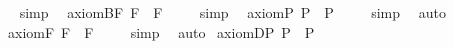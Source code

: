 \begin{isabellebody}
\isadelimproof
\ %
\endisadelimproof
%
\isatagproof
{}\isamarkupfalse%
\ simp\ \isamarkupfalse%
%
\endisatagproof
{\isafoldproof}%
%
\isadelimproof
%
\endisadelimproof
\isanewline
{}\isamarkupfalse%
\ axiom{\isacharunderscore}B{\isacharunderscore}F{\isacharcolon}\ {\isachardoublequoteopen}{\isacharbrackleft}{\isasymphi}\isactrlsup F\ \isactrlbold {\isasymrightarrow}\ \isactrlbold {\isasymbox}{\isacharparenleft}\isactrlbold {\isasymdiamond}{\isacharparenleft}{\isasymphi}\isactrlsup F{\isacharparenright}{\isacharparenright}{\isacharbrackright}\ {\isacharequal}\ {\isasymtop}{\isachardoublequoteclose}%
\isadelimproof
\ %
\endisadelimproof
%
\isatagproof
{}\isamarkupfalse%
\ simp\ \isamarkupfalse%
%
\endisatagproof
{\isafoldproof}%
%
\isadelimproof
%
\endisadelimproof
\isanewline
\isanewline
{}\isamarkupfalse%
\ axiom{\isacharunderscore}{}{\isacharunderscore}P{\isacharcolon}\ {\isachardoublequoteopen}{\isacharbrackleft}\isactrlbold {\isasymbox}{\isacharparenleft}{\isasymphi}\isactrlsup P{\isacharparenright}\ \isactrlbold {\isasymrightarrow}\ \isactrlbold {\isasymdiamond}{\isacharparenleft}{\isasymphi}\isactrlsup P{\isacharparenright}{\isacharbrackright}\ {\isacharequal}\ {\isasymtop}{\isachardoublequoteclose}%
\isadelimproof
\ %
\endisadelimproof
%
\isatagproof
{}\isamarkupfalse%
\ simp\ \isamarkupfalse%
\ auto%
\endisatagproof
{\isafoldproof}%
%
\isadelimproof
%
\endisadelimproof
\isanewline
{}\isamarkupfalse%
\ axiom{\isacharunderscore}{}{\isacharunderscore}F{\isacharcolon}\ {\isachardoublequoteopen}{\isacharbrackleft}\isactrlbold {\isasymbox}{\isacharparenleft}{\isasymphi}\isactrlsup F{\isacharparenright}\ \isactrlbold {\isasymrightarrow}\ \isactrlbold {\isasymdiamond}{\isacharparenleft}{\isasymphi}\isactrlsup F{\isacharparenright}{\isacharbrackright}\ {\isacharequal}\ {\isasymtop}{\isachardoublequoteclose}%
\isadelimproof
\ %
\endisadelimproof
%
\isatagproof
{}\isamarkupfalse%
\ simp\ \isamarkupfalse%
\ auto%
\endisatagproof
{\isafoldproof}%
%
\isadelimproof
%
\endisadelimproof
\isanewline
\isanewline
{}\isamarkupfalse%
\ axiom{\isacharunderscore}D{\isacharunderscore}P{\isacharcolon}\ {\isachardoublequoteopen}{\isacharbrackleft}\isactrlbold {\isasymbox}{\isacharparenleft}{\isasymphi}\isactrlsup P{\isacharparenright}\ \isactrlbold {\isasymrightarrow}\ \isactrlbold {\isasymbox}{\isacharparenleft}\isactrlbold {\isasymbox}{\isacharparenleft}{\isasymphi}\isactrlsup P{\isacharparenright}{\isacharparenright}{\isacharbrackright}\ {\isacharequal}\ {\isasymtop}{\isachardoublequoteclose}%

\end{isabellebody}
